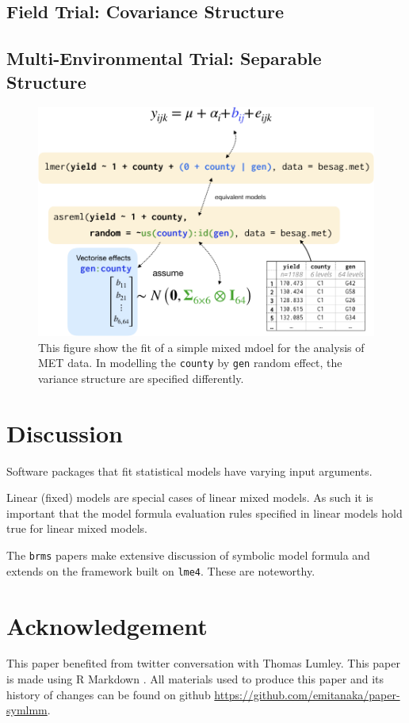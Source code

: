 \documentclass[runningheads]{llncs}
\begin{document}
\hypertarget{atrial}{%
\subsection{Field Trial: Covariance Structure}\label{atrial}}

\hypertarget{MET}{%
\subsection{Multi-Environmental Trial: Separable Structure}\label{MET}}

\begin{figure}
\includegraphics[width=0.9\linewidth,fbox]{images/symbolic_lmm2} \caption{This figure show the fit of a simple mixed mdoel for the analysis of MET data. In modelling the \texttt{county} by \texttt{gen} random effect, the variance structure are specified differently.}\label{fig:symbolic-lmm2}
\end{figure}



\hypertarget{discussion}{%
\section{Discussion}\label{discussion}}

Software packages that fit statistical models have varying input arguments.

Linear (fixed) models are special cases of linear mixed models. As such it is important that the model formula evaluation rules specified in linear models hold true for linear mixed models.

The \texttt{brms} papers make extensive discussion of symbolic model formula and extends on the framework built on \texttt{lme4}. These are noteworthy.

\section*{Acknowledgement}

This paper benefited from twitter conversation with Thomas Lumley. This paper is made using R Markdown \autocite{rmarkdown}. All materials used to produce this paper and its history of changes can be found on github \url{https://github.com/emitanaka/paper-symlmm}.

\printbibliography[title=References]
\end{document}
